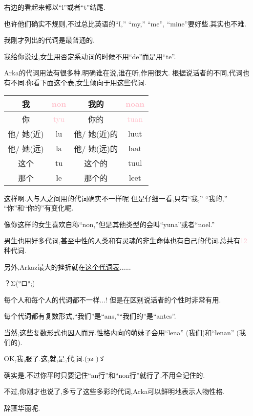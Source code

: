 右边的看起来都以``l''或者``t''结尾.

也许他们确实不规则,不过总比英语的``I,'' ``my,'' ``me'', ``mine''要好些.其实也不难.


我刚才列出的代词是最普通的.

我给你说过,女生用否定系动词的时候不用``de''而是用``te''.

Arka的代词用法有很多种.明确谁在说,谁在听,作用很大.
根据说话者的不同,代词也有不同.你看下面这个表,女生倾向于用这些代词.
\begin{table}[H]
    \begin{tabular}{|c|c|c|c|} %
    \hline
	我&  \textcolor{pink}{non}&  我的&  \textcolor{pink}{noan}\\\hline
	你&  \textcolor{pink}{tyu}&  你的&  \textcolor{pink}{tuan}\\\hline
  	他/ 她(近)&  lu&  他/ 她(近)的&  luut\\\hline
	他/ 她(远)&  la&  他/ 她(远)的&  laat\\\hline
	这个&  tu&  这个的&  tuul\\\hline
	那个&  le&  那个的&  leet\\\hline
	\end{tabular}
\end{table}

这样啊.人与人之间用的代词确实不一样呢
但是仔细一看,只有``我,'' ``我的,'' ``你''和``你的''有变化呢.


像你这样的女生喜欢自称``non,''但是其他类型的会叫``yuna''或者``noel.''

男生也用好多代词,甚至中性的人类和有灵魂的非生命体也有自己的代词.总共有\textcolor{pink}{12}种代词.

另外,Arkaz最大的挫折就在\hyperlink{appendix-pronouns}{这个代词表}......


？Σ(°ロ°;)

每个人和每个人的代词都不一样...! 但是在区别说话者的个性时非常有用.


每个代词都有复数形式,``我们''是``ans,''``我们的''是``antes''.

当然,这些复数形式也因人而异.性格内向的萌妹子会用``lena'' (我们)和``lenan'' (我们的).


OK,我,服了.这,就,是,代,词.(;\CircleShadow ω \CircleShadow )ゞ


确实是.不过你平时只要记住``an行''和``non行''就行了.不用全记住的.

不过,你刚才也说了,多亏了这些多彩的代词,Arka可以鲜明地表示人物性格.


辞藻华丽呢.




